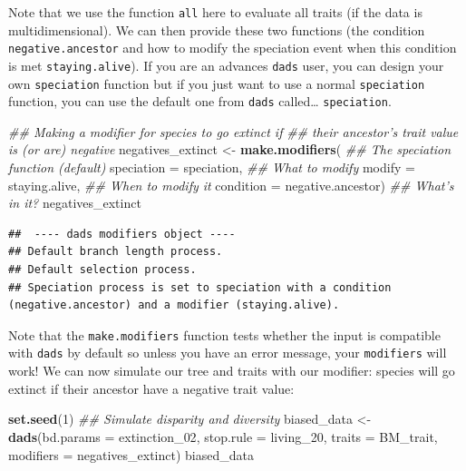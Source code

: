 \documentclass[]{book}
\newenvironment{Shaded}{\begin{snugshade}}{\end{snugshade}}
\newcommand{\CommentTok}[1]{\textcolor[rgb]{0.56,0.35,0.01}{\textit{#1}}}
\newcommand{\DataTypeTok}[1]{\textcolor[rgb]{0.13,0.29,0.53}{#1}}
\newcommand{\DecValTok}[1]{\textcolor[rgb]{0.00,0.00,0.81}{#1}}
\newcommand{\KeywordTok}[1]{\textcolor[rgb]{0.13,0.29,0.53}{\textbf{#1}}}
\newcommand{\NormalTok}[1]{#1}
\newcommand{\StringTok}[1]{\textcolor[rgb]{0.31,0.60,0.02}{#1}}
\begin{document}
Note that we use the function \texttt{all} here to evaluate all traits (if the data is multidimensional).
We can then provide these two functions (the condition \texttt{negative.ancestor} and how to modify the speciation event when this condition is met \texttt{staying.alive}).
If you are an advances \texttt{dads} user, you can design your own \texttt{speciation} function but if you just want to use a normal \texttt{speciation} function, you can use the default one from \texttt{dads} called\ldots{} \texttt{speciation}.

\begin{Shaded}
\begin{Highlighting}[]
\CommentTok{## Making a modifier for species to go extinct if}
\CommentTok{## their ancestor's trait value is (or are) negative}
\NormalTok{negatives_extinct <-}\StringTok{ }\KeywordTok{make.modifiers}\NormalTok{(}
                        \CommentTok{## The speciation function (default)}
                        \DataTypeTok{speciation =}\NormalTok{ speciation,}
                        \CommentTok{## What to modify}
                        \DataTypeTok{modify     =}\NormalTok{ staying.alive,}
                        \CommentTok{## When to modify it}
                        \DataTypeTok{condition  =}\NormalTok{ negative.ancestor)}
\CommentTok{## What's in it?}
\NormalTok{negatives_extinct}
\end{Highlighting}
\end{Shaded}

\begin{verbatim}
##  ---- dads modifiers object ---- 
## Default branch length process.
## Default selection process.
## Speciation process is set to speciation with a condition (negative.ancestor) and a modifier (staying.alive).
\end{verbatim}

Note that the \texttt{make.modifiers} function tests whether the input is compatible with \texttt{dads} by default so unless you have an error message, your \texttt{modifiers} will work!
We can now simulate our tree and traits with our modifier: species will go extinct if their ancestor have a negative trait value:

\begin{Shaded}
\begin{Highlighting}[]
\KeywordTok{set.seed}\NormalTok{(}\DecValTok{1}\NormalTok{)}
\CommentTok{## Simulate disparity and diversity}
\NormalTok{biased_data <-}\StringTok{ }\KeywordTok{dads}\NormalTok{(}\DataTypeTok{bd.params =}\NormalTok{ extinction_}\DecValTok{02}\NormalTok{,}
                    \DataTypeTok{stop.rule =}\NormalTok{ living_}\DecValTok{20}\NormalTok{,}
                    \DataTypeTok{traits    =}\NormalTok{ BM_trait,}
                    \DataTypeTok{modifiers =}\NormalTok{ negatives_extinct)}
\NormalTok{biased_data}
\end{Highlighting}
\end{Shaded}
\end{document}

